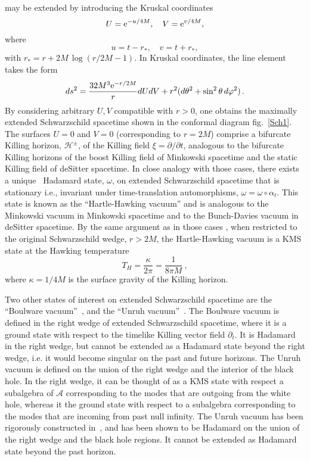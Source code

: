 \documentclass[12pt]{article}
\newcommand{\eA}{\mathscr{A}}
\newcommand{\e}{{\rm e}}
\theoremstyle{plain}
\theoremstyle{definition}
\def\ben{\begin{equation}}
\def\een{\end{equation}}
\begin{document}
may be extended by introducing
the Kruskal coordinates
\ben
U = \e^{-u/4M}, \quad V = \e^{v/4M},
\label{Uu}
\een
where
\ben
u = t - r_*, \quad v = t+r_*,
\een
with $r_* = r + 2M \, \log(r/2M-1)$. In Kruskal coordinates, the line element takes the form
\ben
ds^2 = \frac{32 M^3 \e^{-r/2M}}{r} dUdV + r^2(d\theta^2 + \sin^2
\theta \, d\varphi^2) \, .
\een
By considering arbitrary $U,V$ compatible with $r>0$, one obtains the
maximally extended Schwarzschild spacetime shown in the conformal diagram fig.~\ref{Sch1}. The surfaces $U=0$ and $V=0$ (corresponding to $r=2M$) comprise a bifurcate Killing horizon, ${\mathcal H}^\pm$, of the Killing field $\xi = \partial/\partial t$,
analogous to the bifurcate Killing horizons of the boost Killing field of Minkowski spacetime and the static Killing field of deSitter spacetime. In close analogy with those cases, there exists~\cite{sanders2} a unique~\cite{kaywald}
Hadamard state, $\omega$,
on extended Schwarzschild spacetime
that is stationary i.e., invariant under time-translation automorphisms, $\omega = \omega \circ \alpha_t$. This state is known as the ``Hartle-Hawking vacuum'' and is analogous to the Minkowski vacuum in Minkowski spacetime and to the Bunch-Davies vacuum in deSitter spacetime. By the same argument as in those cases \cite{kaywald}, when restricted to the original Schwarzschild wedge, $r > 2M$, the Hartle-Hawking vacuum is a
KMS state at the Hawking temperature
\ben\label{TH}
T_H = \frac{\kappa}{2\pi} = \frac{1}{8\pi M} \ ,
\een
where $\kappa = 1/4M$ is the surface gravity of the Killing horizon.

Two other states of interest on extended Schwarzschild spacetime are the ``Boulware vacuum''~\cite{boulware}, and the ``Unruh vacuum''~\cite{unruh}.
The Boulware vacuum is defined in the right wedge of extended Schwarzschild spacetime, where it is a ground state with respect to the timelike Killing vector field $\partial_t$.
It is Hadamard in the right wedge, but cannot be extended as a Hadamard state beyond the right wedge, i.e. it would become singular on the past and future horizons. The Unruh
vacuum is defined on the union of the right wedge and the interior of the black hole. In the right wedge, it can be thought of as a KMS state with respect a subalgebra of $\eA$ corresponding
to the modes that are outgoing from the white hole, whereas it the ground state with respect to a subalgebra corresponding to the modes that are incoming from past null infinity.
The Unruh vacuum has been rigorously constructed in~\cite{moretti}, and has been shown to be Hadamard on the union of the right wedge and the black hole regions. It cannot
be extended as Hadamard state beyond the past horizon.
\end{document}
